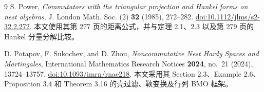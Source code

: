 \documentclass[UTF8,11pt,a4paper,fontset=fandol]{ctexart}
\theoremstyle{remark}
\numberwithin{equation}{section}
\begin{document}
\begin{thebibliography}{9}
S. Power,
\emph{Commutators with the triangular projection and Hankel forms on nest algebras},
J. London Math. Soc. (2) \textbf{32} (1985), 272--282.
\href{https://doi.org/10.1112/jlms/s2-32.2.272}{doi:10.1112/jlms/s2-32.2.272}.
本文使用其第 277 页的距离公式，并与定理 2.1、2.3
以及第 279 页的 Hankel 分量分解比较。

D. Potapov, F. Sukochev, and D. Zhou,
\emph{Noncommutative Nest Hardy Spaces and Martingales},
International Mathematics Research Notices \textbf{2024}, no.~21 (2024), 13724--13757.
\href{https://doi.org/10.1093/imrn/rnae218}{doi:10.1093/imrn/rnae218}.
本文采用其 Section 2.3、Example 2.6、Proposition 3.4
和 Theorem 3.16 的壳过滤、鞅变换及行列 BMO 框架。

\end{thebibliography}
\end{document}
